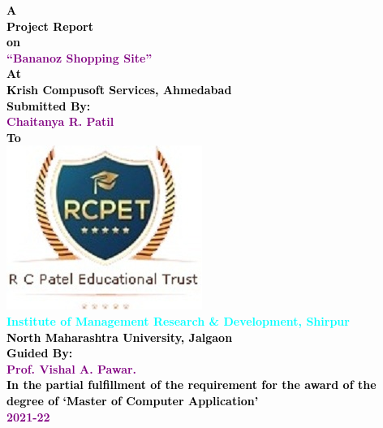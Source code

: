 \thispagestyle{empty}

   \begin{center}
   \Huge \bfseries \textcolor{black} {A}\\[.2cm]
   \Huge \bfseries \textcolor{black} {Project Report}\\[.2cm]
	\Huge \bfseries \textcolor{black} {on}\\[.2cm]
   \huge \bfseries \textcolor{purple} {``Bananoz Shopping Site''}\\[.8cm]
   \Huge \bfseries \textcolor{black} {At}\\[.2cm]
   \Huge \bfseries \textcolor{black} {Krish Compusoft Services, Ahmedabad}\\[.8cm]
   \large \bfseries \textcolor{black} {Submitted By:}\\[.2cm]
     \Large \bfseries \textcolor{purple} {Chaitanya R. Patil}\\[.8cm]
     \Large \bfseries \textcolor{black} {To}\\[.2cm]
      \includegraphics[scale=0.5]{Title/111}\\[0.1cm]
      \Large \bfseries \textcolor{cyan} { Institute of Management Research \& Development, Shirpur}\\[0.1cm]
  
      
   \Large \bfseries \textcolor{black} {North Maharashtra University, Jalgaon }\\[.7cm]
   \large \bfseries \textcolor{black} {Guided By:}\\[.2cm]

   \Large \bfseries \textcolor{purple} {Prof. Vishal A. Pawar.}\\[1cm]
  
   \large \bfseries \textcolor{black} {  In the partial fulfillment of the requirement for the award of the degree of ‘Master of Computer Application’}\\[0.12cm]
   
   \huge \bfseries \textcolor{purple} {2021-22}\\[0.1cm]
\end{center}
